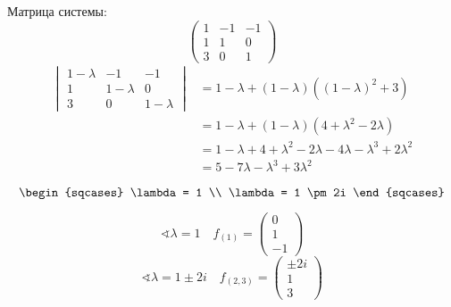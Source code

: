 Матрица системы:
\[\begin{pmatrix} 1 & - 1 & - 1 \\ 1 & 1 & 0 \\ 3 & 0 & 1 \end{pmatrix} \]
\begin{align*}
    \begin{vmatrix}
        1 - \lambda & - 1         & - 1         \\
        1           & 1 - \lambda & 0           \\
        3           & 0           & 1 - \lambda
    \end{vmatrix} & = 1 - \lambda + (1 - \lambda)((1 - \lambda)^2 + 3)                           \\
                               & = 1 - \lambda + (1 - \lambda)(4 + \lambda^2 - 2\lambda)                      \\
                               & = 1 - \lambda + 4 + \lambda^2 - 2\lambda - 4\lambda - \lambda^3 + 2\lambda^2 \\
                               & = 5 - 7\lambda - \lambda^3 + 3\lambda^2
\end{align*}

\[\begin{sqcases}
        \lambda = 1 \\
        \lambda = 1 \pm 2i
    \end{sqcases}\]

\[\sphericalangle \lambda = 1 \quad f_{(1)} = \begin{pmatrix} 0 \\ 1 \\ - 1 \end{pmatrix}\]
\[\sphericalangle \lambda = 1 \pm 2i \quad f_{(2, 3)} = \begin{pmatrix} \pm 2i \\ 1 \\ 3 \end{pmatrix}\]

